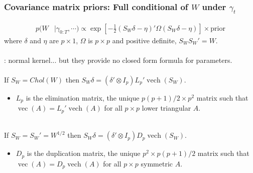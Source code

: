 \documentclass[xcolor=dvipsnames]{beamer}
\DeclareMathOperator{\vech}{vech}
\DeclareMathOperator{\vect}{vec}
\begin{document}
\begin{frame}
\frametitle{Covariance matrix priors: Full conditional of $W$ under $\gamma_t$}
\begin{align*}
  p(W&|\gamma_{0:T},\cdots)\propto \exp\left[-\frac{1}{2}(S_W\delta - \eta)'\Omega(S_W\delta - \eta)\right]\times \mbox{prior}
\end{align*}
where  $\delta$ and $\eta$ are $p\times 1$, $\Omega$ is $p\times p$  and positive definite, $S_WS_W'=W$. \\~\\
\pause\cite{fruhwirth2008bayesian}: normal kernel... \pause but they provide no closed form formula for parameters.\\~\\

\pause If $S_W=Chol(W)$ then $S_W\delta = (\delta' \otimes I_p)L_p'\vech(S_W)$.
\begin{itemize}
\item $L_p$ is the elimination matrix, the unique $p(p+1)/2\times p^2$ matrix such that $\vect(A)=L_p'\vech(A)$ for all $p\times p$ lower triangular $A$.\\~\\
\end{itemize}
\pause If $S_W=S_W'=W^{1/2}$ then $S_W\delta = (\delta' \otimes I_p)D_p\vech(S_W)$.
\begin{itemize}
\item $D_p$ is the duplication matrix, the unique $p^2\times p(p+1)/2$ matrix such that $\vect(A)=D_p\vech(A)$ for all $p\times p$ symmetric $A$.
\end{itemize}
\end{frame}
\end{document}
